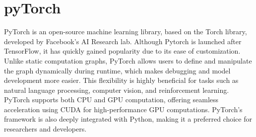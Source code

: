 \section{pyTorch}
\label{sec:pyTorch}
PyTorch is an open-source machine learning library, based on the Torch library, developed by Facebook's AI Research lab. Although Pytorch is launched after TensorFlow, it has quickly gained popularity due to its ease of customization. Unlike static computation graphs, PyTorch allows users to define and manipulate the graph dynamically during runtime, which makes debugging and model development more easier. This flexibility is highly beneficial for tasks such as natural language processing, computer vision, and reinforcement learning. PyTorch supports both CPU and GPU computation, offering seamless acceleration using CUDA for high-performance GPU computations. PyTorch's framework is also deeply integrated with Python, making it a preferred choice for researchers and developers. \cite{pytorchWiki:2024} \cite{pytorch:2024}

